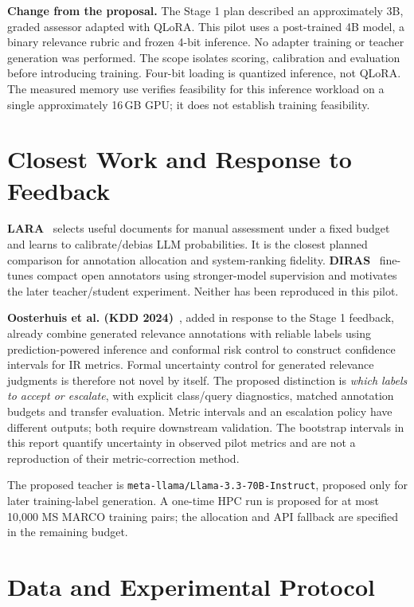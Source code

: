 \documentclass[11pt,a4paper]{article}
\begin{document}
\textbf{Change from the proposal.} The Stage 1 plan described an approximately 3B,
graded assessor adapted with QLoRA. This pilot uses a post-trained 4B model, a
binary relevance rubric and frozen 4-bit inference. No adapter training or teacher
generation was performed. The scope isolates scoring, calibration and evaluation
before introducing training. Four-bit loading is quantized inference, not QLoRA.
The measured memory use verifies feasibility for this inference workload on a
single approximately 16\,GB GPU; it does not establish training feasibility.

\section{Closest Work and Response to Feedback}
\textbf{LARA}~\cite{lara} selects useful documents for manual assessment under a
fixed budget and learns to calibrate/debias LLM probabilities. It is the closest
planned comparison for annotation allocation and system-ranking fidelity.
\textbf{DIRAS}~\cite{diras} fine-tunes compact open annotators using stronger-model
supervision and motivates the later teacher/student experiment. Neither has been
reproduced in this pilot.

\textbf{Oosterhuis et al. (KDD 2024)}~\cite{oosterhuis}, added in response to the
Stage 1 feedback, already combine generated relevance annotations with reliable
labels using prediction-powered inference and conformal risk control to construct
confidence intervals for IR metrics. Formal uncertainty control for generated
relevance judgments is therefore not novel by itself. The proposed distinction is
\emph{which labels to accept or escalate}, with explicit class/query diagnostics,
matched annotation budgets and transfer evaluation. Metric intervals and an
escalation policy have different outputs; both require downstream validation.
The bootstrap intervals in this report quantify uncertainty in observed pilot
metrics and are not a reproduction of their metric-correction method.

The proposed teacher is
\texttt{meta-llama/Llama-3.3-70B-Instruct}, proposed only for later training-label generation.
A one-time HPC run is proposed for at most 10,000 MS MARCO training pairs;
the allocation and API fallback are specified in the remaining budget.

\section{Data and Experimental Protocol}
\end{document}
